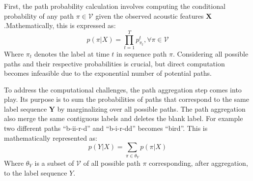  First, the path probability calculation involves computing the conditional probability of any path $\pi \in \mathcal{V}$ given the observed acoustic features $\boldsymbol{X}$.Mathematically, this is expressed as:
 \begin{equation}
    p(\pi|X) = \prod_{t=1}^{T}p_{\pi_t}^{t} , \forall \pi \in \mathcal{V}
\end{equation}
 Where $\pi_t$ denotes the label at time $t$ in sequence path $\pi$. Considering all possible paths and their respective probabilities is crucial, but direct computation becomes infeasible due to the exponential number of potential paths.
 
 To address the computational challenges, the path aggregation step comes into play. Its purpose is to sum the probabilities of paths that correspond to the same label sequence $\boldsymbol{Y}$ by marginalizing over all possible paths. The path aggregation also merge the same contiguous labels and deletes the blank label. For example two different paths ``b-ii-r-d'' and ``b-i-r-dd'' becomes ``bird''. This is mathematically represented as:
\begin{equation}
    p(Y|X) = \sum_{\pi \in \theta_Y}p(\pi|X)
\end{equation}
Where $\theta_Y$ is a subset of $\mathcal{V}$ of all possible path $\pi$ corresponding, after aggregation, to the label sequence $Y$.
 
 

